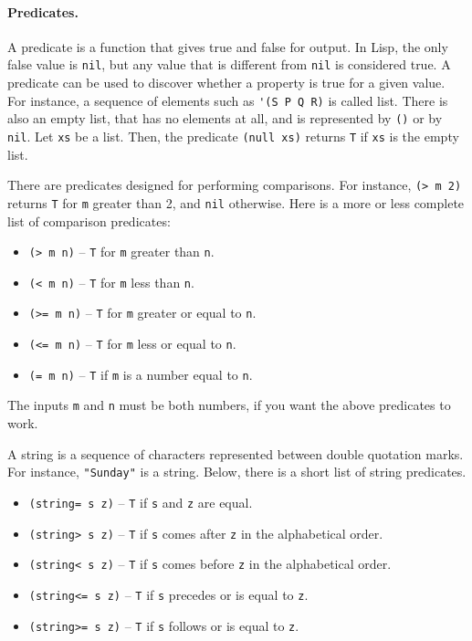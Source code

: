 \documentclass[a4paper,12pt]{book}
\begin{document}
\paragraph{Predicates.} A predicate is a function that gives
true and false for output. In Lisp, the only false value is
\verb|nil|, but any value that is different from \verb|nil|
is considered true. A predicate can be used to discover
whether a property is true for a given value. For instance,
a sequence of elements such as \verb|'(S P Q R)| is called
list. There is also an empty list, that has no elements at
all, and is represented by \verb|()| or by \verb|nil|. Let
\verb|xs| be a list. Then, the predicate \verb|(null xs)|
returns \verb|T| if \verb|xs| is the empty list.

There are predicates designed for performing comparisons.
For instance, \verb|(> m 2)| returns \verb|T| for \verb|m|
greater than 2, and \verb|nil| otherwise. Here is a more or
less complete list of comparison predicates:
\begin{itemize}
\item\verb|(> m n)| -- \verb|T| for
\verb|m| greater than \verb|n|.
\item\verb|(< m n)| -- \verb|T| for
\verb|m| less than \verb|n|.
\item\verb|(>= m n)| -- \verb|T| for
\verb|m| greater or equal to \verb|n|.
\item\verb|(<= m n)| -- \verb|T| for
\verb|m| less or equal to \verb|n|.
\item\verb|(= m n)| -- \verb|T| if
\verb|m| is a number equal to \verb|n|.
\end{itemize}
The inputs \verb|m| and \verb|n| must be both numbers,
if you want the above predicates to work.


A string is a sequence of characters
represented between double quotation
marks. For instance, \verb|"Sunday"|
is a string. Below, there is a short
list of string predicates.
\begin{itemize}
\item\verb|(string= s z)| -- \verb|T|
if \verb|s| and \verb|z| are equal.
\item\verb|(string> s z)| -- \verb|T|
if \verb|s|  comes
after \verb|z| in the alphabetical order.
\item\verb|(string< s z)| -- \verb|T|
if \verb|s| comes before \verb|z|
in the alphabetical order.
\item\verb|(string<= s z)| -- \verb|T| if
\verb|s| precedes or is equal to \verb|z|.
\item\verb|(string>= s z)| -- \verb|T| if
\verb|s| follows or is equal to \verb|z|.
\end{itemize}
\end{document}
